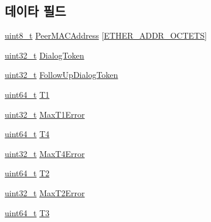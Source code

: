 \subsection*{데이타 필드}
\begin{DoxyCompactItemize}
\item 
\hyperlink{stdint_8h_aba7bc1797add20fe3efdf37ced1182c5}{uint8\+\_\+t} \hyperlink{struct___t_i_m_i_n_g_m_s_m_t___e_v_e_n_t___d_a_t_a_a08d9c385ed7bbc6dd95bd8dedb74d8c1}{Peer\+M\+A\+C\+Address} \mbox{[}\hyperlink{packet_8hpp_ab81d402a4929723091a6731508845125}{E\+T\+H\+E\+R\+\_\+\+A\+D\+D\+R\+\_\+\+O\+C\+T\+E\+TS}\mbox{]}
\item 
\hyperlink{parse_8c_a6eb1e68cc391dd753bc8ce896dbb8315}{uint32\+\_\+t} \hyperlink{struct___t_i_m_i_n_g_m_s_m_t___e_v_e_n_t___d_a_t_a_a5fb015f69f95b9ee9e4f1598c4dc04f0}{Dialog\+Token}
\item 
\hyperlink{parse_8c_a6eb1e68cc391dd753bc8ce896dbb8315}{uint32\+\_\+t} \hyperlink{struct___t_i_m_i_n_g_m_s_m_t___e_v_e_n_t___d_a_t_a_afdd9c8d70ef57e009dbc261c82f6c5ce}{Follow\+Up\+Dialog\+Token}
\item 
\hyperlink{parse_8c_aec6fcb673ff035718c238c8c9d544c47}{uint64\+\_\+t} \hyperlink{struct___t_i_m_i_n_g_m_s_m_t___e_v_e_n_t___d_a_t_a_ac36cc42a03c3d7eaa0966808eb492866}{T1}
\item 
\hyperlink{parse_8c_a6eb1e68cc391dd753bc8ce896dbb8315}{uint32\+\_\+t} \hyperlink{struct___t_i_m_i_n_g_m_s_m_t___e_v_e_n_t___d_a_t_a_a3d7b08143ed2de0d074093ec3256c18e}{Max\+T1\+Error}
\item 
\hyperlink{parse_8c_aec6fcb673ff035718c238c8c9d544c47}{uint64\+\_\+t} \hyperlink{struct___t_i_m_i_n_g_m_s_m_t___e_v_e_n_t___d_a_t_a_a8cea6315d4cb7873c4a4440330e6453f}{T4}
\item 
\hyperlink{parse_8c_a6eb1e68cc391dd753bc8ce896dbb8315}{uint32\+\_\+t} \hyperlink{struct___t_i_m_i_n_g_m_s_m_t___e_v_e_n_t___d_a_t_a_a9ea11f025561c01c068097043b6a583c}{Max\+T4\+Error}
\item 
\hyperlink{parse_8c_aec6fcb673ff035718c238c8c9d544c47}{uint64\+\_\+t} \hyperlink{struct___t_i_m_i_n_g_m_s_m_t___e_v_e_n_t___d_a_t_a_ad8cc08ed91a07fcf4ce99be9664783aa}{T2}
\item 
\hyperlink{parse_8c_a6eb1e68cc391dd753bc8ce896dbb8315}{uint32\+\_\+t} \hyperlink{struct___t_i_m_i_n_g_m_s_m_t___e_v_e_n_t___d_a_t_a_ae66ce688ccf1e0463cea2627ac245de6}{Max\+T2\+Error}
\item 
\hyperlink{parse_8c_aec6fcb673ff035718c238c8c9d544c47}{uint64\+\_\+t} \hyperlink{struct___t_i_m_i_n_g_m_s_m_t___e_v_e_n_t___d_a_t_a_a65706e8b8f5797245ebc879fa8ef65b6}{T3}

\end{DoxyCompactItemize}
